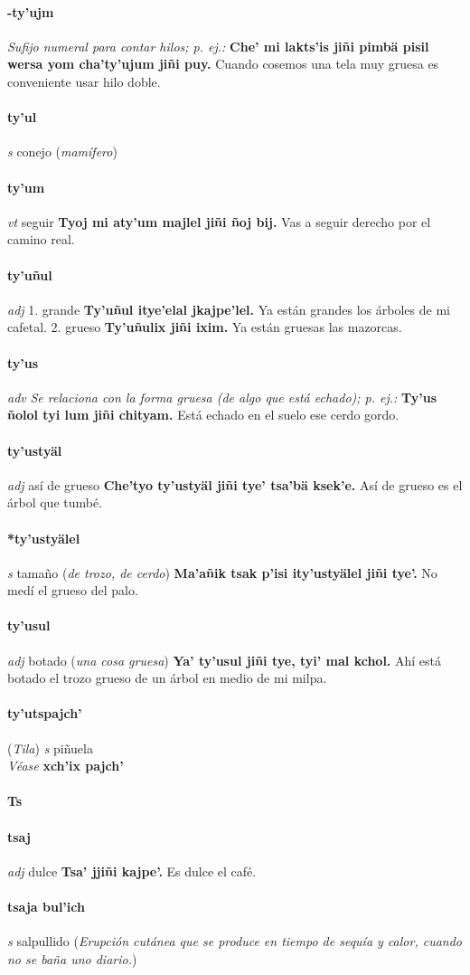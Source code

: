 \documentclass{scrbook}
\newcommand{\entry}[1]{\paragraph{#1}}
\newcommand{\alphaletter}[1]{\addsec{#1}}
\newcommand{\onedefinition}[1]{#1.}
\newcommand{\nontranslationdef}[1]{\textit{#1}}
\newcommand{\partofspeech}[1]{\textit{#1}}
\newcommand{\spanishtranslation}[1]{#1}
\newcommand{\clarification}[1]{(\textit{#1})}
\newcommand{\cholexample}[1]{\textbf{#1}}
\newcommand{\exampletranslation}[1]{#1}
\newcommand{\alsosee}[1]{\\\textit{Véase} \textbf{#1}}
\newcommand{\relevantdialect}[1]{(\textit{#1})}
\begin{document}
\begin{multicols}{2}
\entry{-ty'ujm}
\nontranslationdef{Sufijo numeral para contar hilos; p. ej.:}
\cholexample{Che' mi lakts'is jiñi pimbä pisil wersa yom cha'ty'ujum jiñi puy.}
\exampletranslation{Cuando cosemos una tela muy gruesa es conveniente usar hilo doble.}

\entry{ty'ul}
\partofspeech{s}
\spanishtranslation{conejo}
\clarification{mamífero}

\entry{ty'um}
\partofspeech{vt}
\spanishtranslation{seguir}
\cholexample{Tyoj mi aty'um majlel jiñi ñoj bij.}
\exampletranslation{Vas a seguir derecho por el camino real.}

\entry{ty'uñul}
\partofspeech{adj}
\onedefinition{1}
\spanishtranslation{grande}
\cholexample{Ty'uñul itye'elal jkajpe'lel.}
\exampletranslation{Ya están grandes los árboles de mi cafetal.}
\onedefinition{2}
\spanishtranslation{grueso}
\cholexample{Ty'uñulix jiñi ixim.}
\exampletranslation{Ya están gruesas las mazorcas.}

\entry{ty'us}
\partofspeech{adv}
\nontranslationdef{Se relaciona con la forma gruesa (de algo que está echado); p. ej.:}
\cholexample{Ty'us ñolol tyi lum jiñi chityam.}
\exampletranslation{Está echado en el suelo ese cerdo gordo.}

\entry{ty'ustyäl}
\partofspeech{adj}
\spanishtranslation{así de grueso}
\cholexample{Che'tyo ty'ustyäl jiñi tye' tsa'bä ksek'e.}
\exampletranslation{Así de grueso es el árbol que tumbé.}

\entry{*ty'ustyälel}
\partofspeech{s}
\spanishtranslation{tamaño}
\clarification{de trozo, de cerdo}
\cholexample{Ma'añik tsak p'isi ity'ustyälel jiñi tye'.}
\exampletranslation{No medí el grueso del palo.}

\entry{ty'usul}
\partofspeech{adj}
\spanishtranslation{botado}
\clarification{una cosa gruesa}
\cholexample{Ya' ty'usul jiñi tye, tyi' mal kchol.}
\exampletranslation{Ahí está botado el trozo grueso de un árbol en medio de mi milpa.}

\entry{ty'utspajch'}
\relevantdialect{Tila}
\partofspeech{s}
\spanishtranslation{piñuela}
\alsosee{xch'ix pajch'}

\entry{Ts}
\alphaletter{Ts}

\entry{tsaj}
\partofspeech{adj}
\spanishtranslation{dulce}
\cholexample{Tsa' jjiñi kajpe'.}
\exampletranslation{Es dulce el café.}

\entry{tsaja bul'ich}
\partofspeech{s}
\spanishtranslation{salpullido}
\clarification{Erupción cutánea que se produce en tiempo de sequía y calor, cuando no se baña uno diario.}


\end{multicols}
\end{document}
